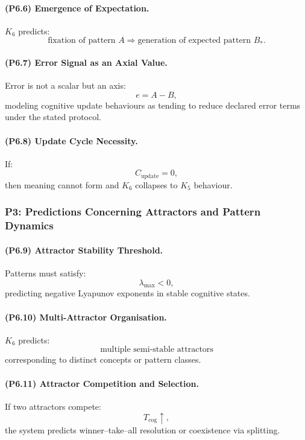 \paragraph{(P6.6) Emergence of Expectation.}
$K_6$ predicts:
\[
\text{fixation of pattern } A \Rightarrow \text{generation of expected pattern } B_\ast.
\]

\paragraph{(P6.7) Error Signal as an Axial Value.}
Error is not a scalar but an axis:
\[
e = A - B,
\]
modeling cognitive update behaviours as tending to reduce declared error terms under the stated protocol.

\paragraph{(P6.8) Update Cycle Necessity.}
If:
\[
C_{\mathrm{update}} = 0,
\]
then meaning cannot form and $K_6$ collapses to $K_5$ behaviour.

\subsubsection{P3: Predictions Concerning Attractors and Pattern Dynamics}

\paragraph{(P6.9) Attractor Stability Threshold.}
Patterns must satisfy:
\[
\lambda_{\max} < 0,
\]
predicting negative Lyapunov exponents in stable cognitive states.

\paragraph{(P6.10) Multi-Attractor Organisation.}
$K_6$ predicts:
\[
\text{multiple semi-stable attractors}
\]
corresponding to distinct concepts or pattern classes.

\paragraph{(P6.11) Attractor Competition and Selection.}
If two attractors compete:
\[
T_{\mathrm{cog}} \uparrow,
\]
the system predicts winner–take–all resolution or coexistence via splitting.

